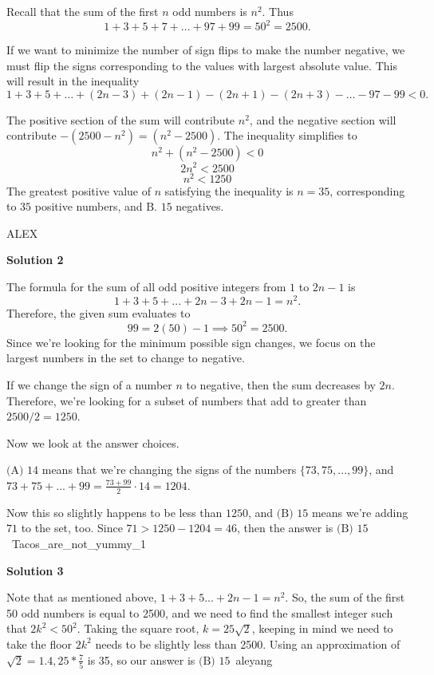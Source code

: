 \begin{enumerate}
Recall that the sum of the first $n$ odd numbers is $n^2$. Thus 
 \[1 + 3 + 5 + 7+ \dots + 97 + 99 = 50^2 = 2500.\]

 If we want to minimize the number of sign flips to make the number negative, we must flip the signs corresponding to the values with largest absolute value. This will result in the inequality 
 \[1 + 3 + 5 +\dots + (2n - 3) + (2n - 1) - (2n + 1) - (2n + 3)-\dots - 97 - 99 < 0.\]

 The positive section of the sum will contribute $n^2$, and the negative section will contribute $-(2500-n^2) = (n^2 - 2500)$. The inequality simplifies to
 \[n^2 + (n^2 - 2500) < 0\]
 \[2n^2 < 2500\]
 \[n^2 < 1250\]The greatest positive value of $n$ satisfying the inequality is $n = 35$, corresponding to $35$ positive numbers, and $\boxed{\text{B. } 15}$ negatives.

 ALEX

 



\textbf{Solution 2}

The formula for the sum of all odd positive integers from $1$ to $2n-1$ is 
 \[1+3+5+...+2n-3+2n-1=n^2.\]Therefore, the given sum evaluates to 
 \[99=2(50)-1\implies 50^2=2500.\] Since we're looking for the minimum possible sign changes, we focus on the largest numbers in the set to change to negative.

 If we change the sign of a number $n$ to negative, then the sum decreases by $2n$. Therefore, we're looking for a subset of numbers that add to greater than $2500/2=1250$.

 Now we look at the answer choices.

 $\text{(A) }14$ means that we're changing the signs of the numbers $\{73,75,...,99\}$, and $73+75+...+99=\frac{73+99}{2} \cdot 14=1204$. 

 Now this so slightly happens to be less than $1250$, and $\text{(B) } 15$ means we're adding $71$ to the set, too. Since $71>1250-1204=46$, then the answer is $\boxed{\text{(B) }15}$ ~Tacos\_are\_not\_yummy\_1

 



\textbf{Solution 3}

Note that as mentioned above, $1 + 3 + 5... + 2n - 1 = n^{2}$. So, the sum of the first 50 odd numbers is equal to 2500, and we need to find the smallest integer such that $2k^{2} < 50^{2}$. Taking the square root, $k = 25\sqrt{2}$, keeping in mind we need to take the floor $2k^{2}$ needs to be slightly less than 2500. Using an approximation of $\sqrt{2} = 1.4, 25 * \frac{7}{5}$ is 35, so our answer is $\boxed{\text{(B) }15}$~aleyang


\end{enumerate}

